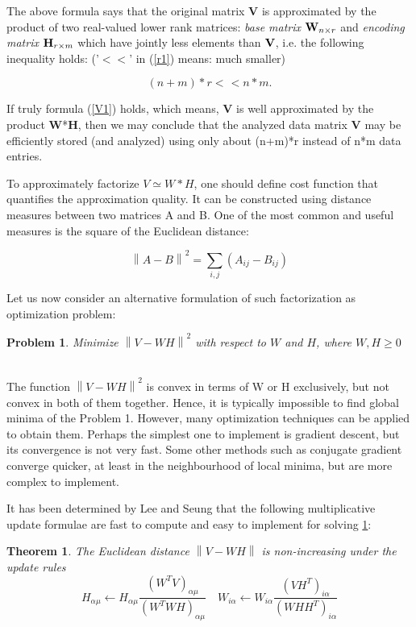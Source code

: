 \documentclass[conference,a4paper]{IEEEtran}
\newcommand{\beq}{\begin{equation}}
\newcommand{\eeq}{\end{equation}}
\newcommand{\norm}[1]{\left\lVert#1\right\rVert}
\newtheorem{problem}{Problem}
\newtheorem{theorem}{Theorem}
\begin{document}
The above formula says  that the original matrix \textbf{V} is
approximated by the product of two real-valued lower rank matrices: \emph{base matrix} ${\bf
W}_{n\times r}$ and \emph{encoding matrix} ${\bf H}_{r\times m}$  which have jointly less
elements than ${\bf V}$, i.e. the following inequality holds:
('$< <$' in (\ref{r1}) means: much smaller)

\begin{equation}\label{r1}
    (n+m)*r<\hspace{1pt}< n*m . 
\end{equation}

If truly formula (\ref{V1}) holds, which means, {\bf V} is well
approximated by the product {\bf W}*{\bf H}, then we may conclude that the
analyzed data matrix {\bf V} may be efficiently stored (and analyzed)
using only about (n+m)*r instead  of n*m data entries.

To approximately factorize $V\simeq{W*H}$, one should define cost function
that quantifies the approximation quality. It can be constructed
using distance measures between two matrices A and B. One of the most common and useful
measures is the square of the Euclidean distance:

\beq  
\norm{A-B}^2=\sum_{i,j}\left(A_{ij}-B_{ij} \right)
\eeq

Let us now consider an alternative formulation of such factorization as optimization problem: 
\newline
\begin{problem}
\label{prob:1}
Minimize $\norm{V-WH}^2$ with respect to $W$ and $H$, where $W,H \geq 0$
\end{problem}
~\\

The function $\norm{V-WH}^2$ is convex in terms of W or H exclusively, but not convex in both of them together. Hence, it is typically impossible to find global minima of the Problem 1. However, many optimization techniques can be applied to obtain them.
Perhaps the simplest one to implement is gradient descent, but its convergence is not very fast. Some other methods such as conjugate gradient converge quicker, at least in the neighbourhood of local minima, but are more complex to implement.

It has been determined by Lee and Seung that the following multiplicative update formulae are fast to compute and easy to implement for solving \ref{prob:1}:
\newline
\begin{theorem}
The Euclidean distance $\norm{V-WH}$ is non-increasing under the update rules 
\begin{equation}
    H_{\alpha\mu} \leftarrow H_{\alpha\mu}\frac{(W^TV)_{\alpha\mu}}{(W^TWH)_{\alpha\mu}} \quad
    W_{i\alpha} \leftarrow W_{i\alpha}\frac{(VH^T)_{i\alpha}}{(WHH^T)_{i\alpha}}
\end{equation}
\end{theorem}
~\\
\end{document}

